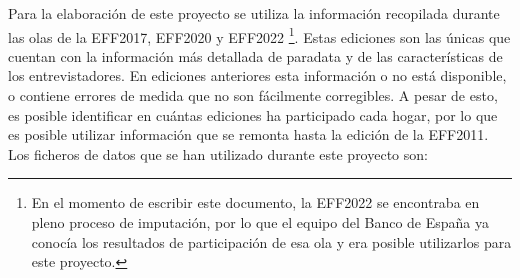 Para la elaboración de este proyecto se utiliza la información recopilada durante las olas de la EFF2017, EFF2020 y EFF2022 \footnote{En el momento de escribir este documento, la EFF2022 se encontraba en pleno proceso de imputación, por lo que el equipo del Banco de España ya conocía los resultados de participación de esa ola y era posible utilizarlos para este proyecto.}. Estas ediciones son las únicas que cuentan con la información más detallada de paradata y de las características de los entrevistadores. En ediciones anteriores esta información o no está disponible, o contiene errores de medida que no son fácilmente corregibles. A pesar de esto, es posible identificar en cuántas ediciones ha participado cada hogar, por lo que es posible utilizar información que se remonta hasta la edición de la EFF2011. Los ficheros de datos que se han utilizado durante este proyecto son:

